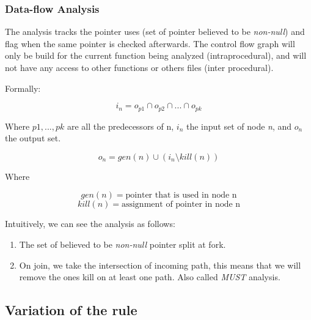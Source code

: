\subsubsection{Data-flow Analysis}
\label{subsubsec:data_flow_analysis}

The analysis tracks the pointer uses (set of pointer believed to be \emph{non-null}) and flag when the same pointer is checked afterwards. 
The control flow graph will only be build for the current function being analyzed (intraprocedural), and will not have any access to other functions or others files (inter procedural).

Formally:

\begin{equation}\label{eqn:dataflow1}
i_{n} = o_{p1}  \cap   o_{p2}  \cap  ... \cap   o_{pk}
\end{equation}

Where $p1, ..., pk$ are all the predecessors of n, $i_{n}$ the input set of node \emph{n}, and  $o_{n}$ the output set.

\begin{equation}\label{eqn:dataflow2}
o_{n} = gen(n)  \cup   (i_{n} \setminus kill(n))
\end{equation}

Where

\begin{equation}\label{eqn:dataflow3}
gen(n) =\text{pointer that is used in node n}
\end{equation}
\begin{equation}\label{eqn:dataflow4}
kill(n) = \text{assignment of pointer in node n}
\end{equation}

Intuitively, we can see the analysis as follows:
\begin{enumerate}
	\item The set of believed to be \emph{non-null} pointer split at fork. \newline 
	\item On join, we take the intersection of incoming path, this means that we will remove the ones kill on at least one path. Also called \emph{MUST} analysis. \newline 
\end{enumerate}

\subsection{Variation of the rule}
\label{subsec:rule_variation}

